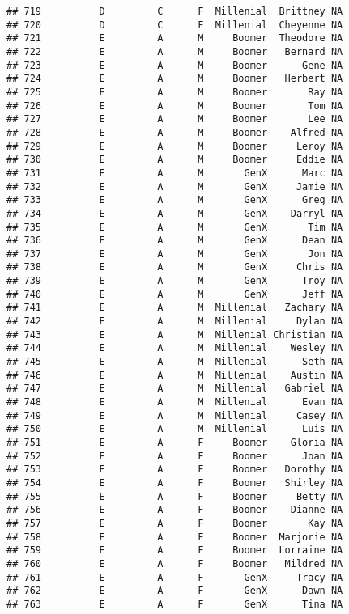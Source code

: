 \documentclass[
]{article}
\begin{document}
\begin{verbatim}
## 719          D         C      F  Millenial  Brittney NA
## 720          D         C      F  Millenial  Cheyenne NA
## 721          E         A      M     Boomer  Theodore NA
## 722          E         A      M     Boomer   Bernard NA
## 723          E         A      M     Boomer      Gene NA
## 724          E         A      M     Boomer   Herbert NA
## 725          E         A      M     Boomer       Ray NA
## 726          E         A      M     Boomer       Tom NA
## 727          E         A      M     Boomer       Lee NA
## 728          E         A      M     Boomer    Alfred NA
## 729          E         A      M     Boomer     Leroy NA
## 730          E         A      M     Boomer     Eddie NA
## 731          E         A      M       GenX      Marc NA
## 732          E         A      M       GenX     Jamie NA
## 733          E         A      M       GenX      Greg NA
## 734          E         A      M       GenX    Darryl NA
## 735          E         A      M       GenX       Tim NA
## 736          E         A      M       GenX      Dean NA
## 737          E         A      M       GenX       Jon NA
## 738          E         A      M       GenX     Chris NA
## 739          E         A      M       GenX      Troy NA
## 740          E         A      M       GenX      Jeff NA
## 741          E         A      M  Millenial   Zachary NA
## 742          E         A      M  Millenial     Dylan NA
## 743          E         A      M  Millenial Christian NA
## 744          E         A      M  Millenial    Wesley NA
## 745          E         A      M  Millenial      Seth NA
## 746          E         A      M  Millenial    Austin NA
## 747          E         A      M  Millenial   Gabriel NA
## 748          E         A      M  Millenial      Evan NA
## 749          E         A      M  Millenial     Casey NA
## 750          E         A      M  Millenial      Luis NA
## 751          E         A      F     Boomer    Gloria NA
## 752          E         A      F     Boomer      Joan NA
## 753          E         A      F     Boomer   Dorothy NA
## 754          E         A      F     Boomer   Shirley NA
## 755          E         A      F     Boomer     Betty NA
## 756          E         A      F     Boomer    Dianne NA
## 757          E         A      F     Boomer       Kay NA
## 758          E         A      F     Boomer  Marjorie NA
## 759          E         A      F     Boomer  Lorraine NA
## 760          E         A      F     Boomer   Mildred NA
## 761          E         A      F       GenX     Tracy NA
## 762          E         A      F       GenX      Dawn NA
## 763          E         A      F       GenX      Tina NA

\end{verbatim}
\end{document}
